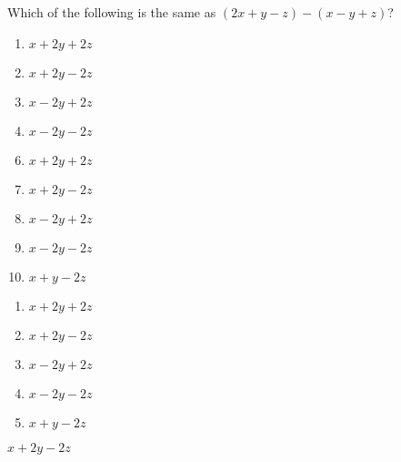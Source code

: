 



 Which of the following is the same as $(2x+y-z)-(x-y+z)$?


\ifsat
	\begin{enumerate}[label=\Alph*)]
		\item  $x+2y+2z$
		\item  $x+2y-2z$%
		\item  $x-2y+2z$
		\item  $x-2y-2z$
	\end{enumerate}
\else
\fi

\ifacteven
	\begin{enumerate}[label=\textbf{\Alph*.},itemsep=\fill,align=left]
		\setcounter{enumii}{5}
		\item  $x+2y+2z$
		\item  $x+2y-2z$%
		\item  $x-2y+2z$
		\addtocounter{enumii}{1}
		\item  $x-2y-2z$
		\item  $x+y-2z$
	\end{enumerate}
\else
\fi

\ifactodd
	\begin{enumerate}[label=\textbf{\Alph*.},itemsep=\fill,align=left]
		\item  $x+2y+2z$
		\item  $x+2y-2z$%
		\item  $x-2y+2z$
		\item  $x-2y-2z$
		\item  $x+y-2z$
	\end{enumerate}
\else
\fi

\ifgridin
  $x+2y-2z$%
		
\else
\fi

